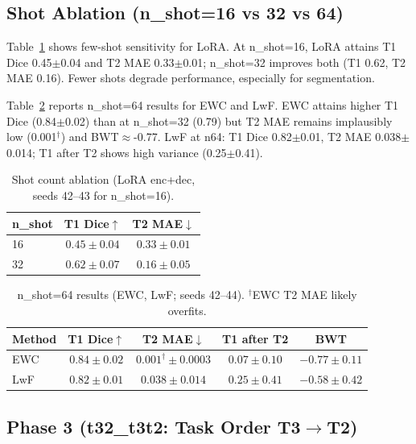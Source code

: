 \subsection{Shot Ablation (n\_shot=16 vs 32 vs 64)}
\label{sec:shot}

Table~\ref{tab:shot} shows few-shot sensitivity for LoRA. At n\_shot=16, LoRA attains T1 Dice 0.45$\pm$0.04 and T2 MAE 0.33$\pm$0.01; n\_shot=32 improves both (T1 0.62, T2 MAE 0.16). Fewer shots degrade performance, especially for segmentation.

Table~\ref{tab:shot64} reports n\_shot=64 results for EWC and LwF. EWC attains higher T1 Dice (0.84$\pm$0.02) than at n\_shot=32 (0.79) but T2 MAE remains implausibly low (0.001$^\dagger$) and BWT$\approx$-0.77. LwF at n64: T1 Dice 0.82$\pm$0.01, T2 MAE 0.038$\pm$0.014; T1 after T2 shows high variance (0.25$\pm$0.41).

\begin{table}[t]
\caption{Shot count ablation (LoRA enc+dec, seeds 42--43 for n\_shot=16).}
\label{tab:shot}
\centering
\begin{tabular}{lcc}
\toprule
n\_shot & T1 Dice$\uparrow$ & T2 MAE$\downarrow$ \\
\midrule
16 & $0.45 \pm 0.04$ & $0.33 \pm 0.01$ \\
32 & $0.62 \pm 0.07$ & $0.16 \pm 0.05$ \\
\bottomrule
\end{tabular}
\end{table}

\begin{table}[t]
\caption{n\_shot=64 results (EWC, LwF; seeds 42--44). $^\dagger$EWC T2 MAE likely overfits.}
\label{tab:shot64}
\centering
\begin{tabular}{lcccc}
\toprule
Method & T1 Dice$\uparrow$ & T2 MAE$\downarrow$ & T1 after T2 & BWT \\
\midrule
EWC & $0.84 \pm 0.02$ & $0.001^\dagger \pm 0.0003$ & $0.07 \pm 0.10$ & $-0.77 \pm 0.11$ \\
LwF & $0.82 \pm 0.01$ & $0.038 \pm 0.014$ & $0.25 \pm 0.41$ & $-0.58 \pm 0.42$ \\
\bottomrule
\end{tabular}
\end{table}

\subsection{Phase 3 (t32\_t3t2: Task Order T3$\to$T2)}
\label{sec:t32}

